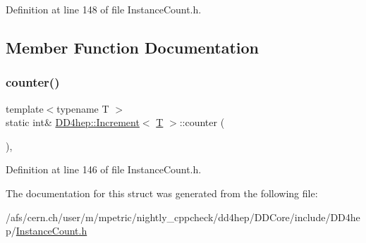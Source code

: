 Definition at line 148 of file Instance\+Count.\+h.



\subsection{Member Function Documentation}
\hypertarget{struct_d_d4hep_1_1_increment_afac4a87bcf31df0fb0053a61ec800048}{}\label{struct_d_d4hep_1_1_increment_afac4a87bcf31df0fb0053a61ec800048} 
\subsubsection{\texorpdfstring{counter()}{counter()}}
{\footnotesize\ttfamily template$<$typename T $>$ \\
static int\& \hyperlink{struct_d_d4hep_1_1_increment}{D\+D4hep\+::\+Increment}$<$ \hyperlink{class_t}{T} $>$\+::counter (\begin{DoxyParamCaption}{ }\end{DoxyParamCaption})\hspace{0.3cm}{\ttfamily [inline]}, {\ttfamily [static]}}



Definition at line 146 of file Instance\+Count.\+h.



The documentation for this struct was generated from the following file\+:\begin{DoxyCompactItemize}
\item 
/afs/cern.\+ch/user/m/mpetric/nightly\+\_\+cppcheck/dd4hep/\+D\+D\+Core/include/\+D\+D4hep/\hyperlink{_instance_count_8h}{Instance\+Count.\+h}\end{DoxyCompactItemize}
